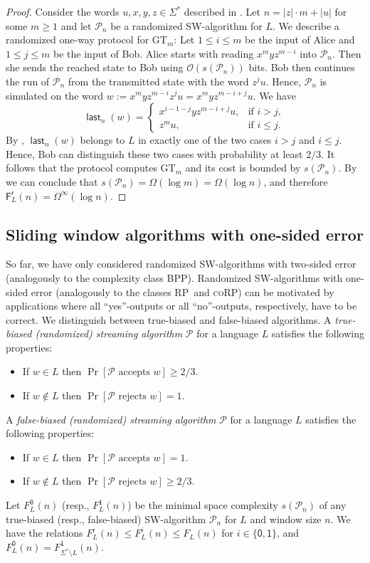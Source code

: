 \documentclass{theoretics}
\renewcommand{\O}{\mathcal{O}}
\renewcommand{\P}{\mathcal{P}}
\newcommand{\F}{\mathsf{F}}
\renewcommand{\r}{\mathsf{r}}
\DeclareMathOperator{\last}{\mathsf{last}}
\newcommand{\BPP}{\textsc{BPP}}
\newcommand{\RP}{\textsc{RP}}
\newcommand{\coRP}{\textsc{coRP}}
\renewcommand{\geq}{\geqslant}
\renewcommand{\leq}{\leqslant}
\renewcommand{\ge}{\geq}
\renewcommand{\le}{\leq}
\newcommand{\Omegainf}{\Omega^{\scriptscriptstyle{\infty}}}
\begin{document}
\begin{proof}
Consider the words $u,x,y,z\in\Sigma^*$ described in .
Let $n= |z| \cdot m+|u|$ for some $m \ge 1$
and let $\P_n$ be a randomized SW-algorithm for $L$.
We describe a randomized one-way protocol for $\mathrm{GT}_m$:
Let $1 \le i \le m$ be the input of Alice and $1 \le j \le m$ be the input of Bob.
Alice starts with reading $x^m y z^{m-i}$ into $\P_n$. Then she sends the reached state to Bob using $\O(s(\P_n))$ bits.
Bob then continues the run of $\P_n$ from the transmitted state with the word $z^j u$.
Hence, $\P_n$ is simulated on the word $w := x^m y z^{m-i} z^j u = x^m y z^{m-i+j} u$.
We have
\[
	\last_n(w) = \begin{cases}
	x^{i-1-j} y z^{m-i+j} u, & \text{if } i > j, \\
	z^m u, & \text{if } i \le j.
	\end{cases}
\]
By , $\last_n(w)$ belongs to $L$ in exactly one of the two cases
$i>j$ and $i \leq j$. Hence, Bob can distinguish these two cases with probability at least $2/3$.
It follows that the protocol computes $\mathrm{GT}_m$ and its cost is bounded by $s(\P_n)$.
By  we can conclude that $s(\P_n) = \Omega(\log m) = \Omega(\log n)$,
and therefore $\F^\r_L(n) = \Omegainf(\log n)$.
\end{proof}

\subsection{Sliding window algorithms with one-sided error} \label{sec-one-sided}

So far, we have only considered randomized SW-algorithms with two-sided error (analogously to the 
complexity class \BPP).
Randomized SW-algorithms with one-sided error (analogously to the 
classes \RP~and \coRP) can be motivated by applications where all ``yes''-outputs or
all ``no''-outputs, respectively, have to be correct. 
We distinguish between true-biased and false-biased algorithms.
A {\em true-biased (randomized) streaming algorithm} $\P$ for a language $L$ 
satisfies the following properties:
\begin{itemize}
	\item If $w \in L$ then $\Pr[\P \text{ accepts } w] \ge 2/3$.
	\item If $w \notin L$ then $\Pr[\P \text{ rejects } w] = 1$.
\end{itemize}
A {\em false-biased (randomized) streaming algorithm} $\P$ for a language $L$ satisfies the following properties:
\begin{itemize}
	\item If $w \in L$ then $\Pr[\P \text{ accepts } w]  = 1$.
	\item If $w \notin L$ then $\Pr[\P \text{ rejects } w] \ge 2/3$.
\end{itemize}
Let $F^\mathsf{0}_L(n)$ (resp., $F^\mathsf{1}_L(n)$) be the minimal space complexity $s(\P_n)$
of any true-biased (resp., false-biased) SW-algorithm $\P_n$ for $L$ and window size $n$.
We have the relations $F^\r_L(n) \le F^i_L(n) \le F_L(n)$ for $i \in \{ \mathsf{0}, \mathsf{1} \}$,
and $F^\mathsf{0}_L(n) = F^\mathsf{1}_{\Sigma^* \setminus L}(n)$.
\end{document}
